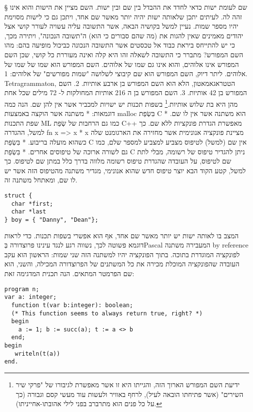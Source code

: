      § שם לעומת ישות
      כדאי לחדד את ההבדל בין שם ובין ישות. השם מציין את הישות והוא אינו זהה לה. לעיתים יתכן שלאותה ישות יהיה יותר מאשר שם אחד, ויתכן גם כי לישות מסוימת יהיו מספר שמות.
      נעיין למשל בקושיה הבאה, אשר התשובה עליה עשויה לעורר קושי אצל יהודים מאמינים שאין להגות את (מה שהם סבורים כי הוא) ה"תשובה הנכונה", ויתירה מכך, כי יש להתייחס ביראת כבוד אל טכסטים אשר התשובה הנכונה כביכול מופיעה בהם:
      מהו השם המפורש?
      מתברר כי התשובה לשאלה זהו היא קלה ואינה מעוררת כל קושי, שכן השם המפורש אינו אלוהים, והוא אינו גם שמו של אלוהים. השם המפורש הוא שמו של שמו של אלוהים. ליתר דיוק, השם המפורש הוא שם קיבוצי לשלושה "שמות מפורשים" של אלוהים:
      1. Tetragrammaton, הטטראגאמאטון, הלא הוא השם המפורש בן ארבע אותיות.
      2. השם המפורש בן 42 אותיות.
      3. השם המפורש בן ה 216 אותיות המחולקות ל- 72 מילים שכל אחת מהן היא בת שלוש אותיות.\footnote{ידיעת השם המפורש הארוך הזה, והגייתו היא זו אשר מאפשרת לגיבורו של "פרקי שיר השירים" (אשר פתיחתו הובאה לעיל), לרחף באוויר ולעשות עוד מעשי קסם וגבורה (כך על כל פנים הוא מתרברב  בפני לילי אהובתו-אחייניתו).}
      בשפות תכנות יש ישויות למכביר אשר אין להן שם. הנה כמה דוגמאות:
      * משתנה אשר הוקצה באמצעות malloc בִּשְׂפַת C הוא משתנה אשר אין לו שם.
      * שפת התכנות ML כמו גם הרחבות של שְׂפַת C++ מאפשרת הגדרת פונקציות ללא שם.
      כך למשל, ההגדרה
      fn x => x * x
      מציינת פונקציה אנונימית אשר מחזירה את הארגומנט שלה כשהוא מועלה בריבוע.
      * בִּשְׂפַת C אין שם (למשל) לטיפוס מצביע למצביע למספר שלם, כמו גם לשורה ארוכה של טיפוסים אחרים.
      * בִּשְׂפַת C ניתן להגדיר טיפוס של רשומה, מבלי לתת שם לטיפוס, על העובדה שהגדרת טיפוס רשומה מלווה בדרך כלל במתן שם לטיפוס.
      כך למשל, קטע הקוד הבא יוצר טיפוס חדש שהוא אנונימי, מגדיר משתנה מהטיפוס הזה אשר יש לו שם, ומאתחל משתנה זה.

      \begin{verbatim}
struct { 
  char *first; 
  char *last
} boy = { "Danny", "Dean"}; 
      \end{verbatim}


      המצב בו לאותה ישות יש יותר מאשר שם אחד, אף הוא אפשרי בשפות תכנות. כדי לראות
      דוגמא פשוטה לכך, נשווה רגע לנגד עינינו פרוצדורה בְּPascal המעבירה משתנה by
      reference לפונקציה המוגדרת בתוכה. בתוך הפונקציה יהיו למשתנה הזה שני שמות:
      הראשון הוא עקב העובדה שהפונקציה המוכלת מכירה את כל המשתנים של הפרוצדורה המכילה,
      והשני, הוא שם הפרמטר המתאים. הנה תכנית המדגימה זאת:

      \begin{verbatim}
program n;
var a: integer;
  function t(var b:integer): boolean;
  (* This function seems to always return true, right? *)
  begin
    a := 1; b := succ(a); t := a <> b
  end;
begin
   writeln(t(a))
end.
      \end{verbatim}


